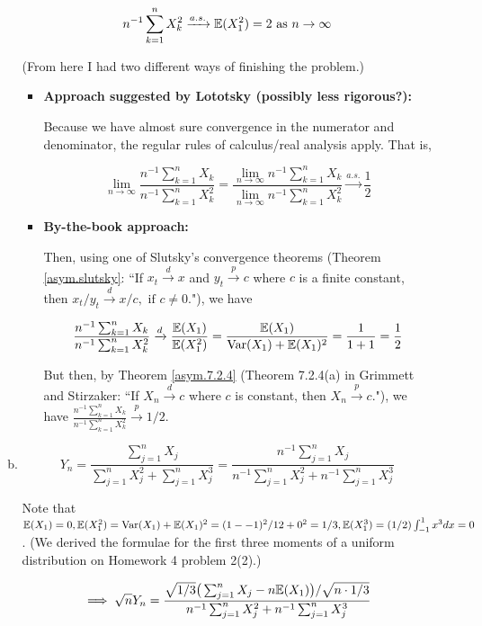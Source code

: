 \begin{enumerate}[(1)]
\begin{enumerate}[(a)]
\[
 n^{-1}\sum_{k=1}^n X_k^2 \xrightarrow{a.s.}\mathbb{E}(X_1^2) = 2 \text{ as } n \to \infty
 \]

(From here I had two different ways of finishing the problem.)

\begin{itemize}

\item \textbf{Approach suggested by Lototsky (possibly less rigorous?):}
 
 Because we have almost sure convergence in the numerator and denominator, the regular rules of calculus/real analysis apply. That is,
 
 \[
 \lim_{n \to \infty} \frac{n^{-1}\sum_{k=1}^n X_k}{n^{-1}\sum_{k=1}^n X_k^2} =  \frac{\lim_{n \to \infty} n^{-1}\sum_{k=1}^n X_k}{\lim_{n \to \infty} n^{-1}\sum_{k=1}^n X_k^2} \xrightarrow{a.s.} \boxed{\frac{1}{2}}
 \]

\item \textbf{By-the-book approach:}

Then, using one of  Slutsky's convergence theorems (Theorem \ref{asym.slutsky}: ``If \(x_t \xrightarrow{d} x\) and \(y_t \xrightarrow{p} c\) where \(c\) is a finite constant, then \(x_t/y_t \xrightarrow{d}  x/c, \text{ if } c \neq 0\)."), we have

\[
\frac{n^{-1}\sum_{k=1}^n X_k}{n^{-1}\sum_{k=1}^n X_k^2} \xrightarrow{d} \frac{\mathbb{E}(X_1)}{\mathbb{E}(X_1^2)} =  \frac{\mathbb{E}(X_1)}{\mathrm{Var}(X_1) + \mathbb{E}(X_1)^2}  =  \frac{1}{1+1} = \frac{1}{2}
\]

But then, by Theorem \ref{asym.7.2.4} (Theorem 7.2.4(a) in Grimmett and Stirzaker: ``If \(X_n \xrightarrow{d} c\) where \(c\) is constant, then \(X_n \xrightarrow{p} c\)."), we have \(\frac{n^{-1}\sum_{k=1}^n X_k}{n^{-1}\sum_{k=1}^n X_k^2} \xrightarrow{p} 1/2\). 

\end{itemize}

\item 

\[
Y_n = \frac{\sum_{j=1}^n X_j}{\sum_{j=1}^n X_j^2 + \sum_{j=1}^n X_j^3} =  \frac{n^{-1}\sum_{j=1}^n X_j}{n^{-1}\sum_{j=1}^n X_j^2 + n^{-1}\sum_{j=1}^n X_j^3} 
\]

Note that \(\mathbb{E}(X_1) = 0, \mathbb{E}(X_1^2) = \mathrm{Var}(X_1) + \mathbb{E}(X_1)^2 = (1 - -1)^2/12 + 0^2 = 1/3 , \mathbb{E}(X_1^3) = (1/2) \int_{-1}^1 x^3 dx = 0 \). (We derived the formulae for the first three moments of a uniform distribution on Homework 4 problem 2(2).) 

\[
\implies \sqrt{n} Y_n =  \frac{\sqrt{1/3} \big(\sum_{j=1}^n X_j - n\mathbb{E}(X_1) \big)/ \sqrt{n \cdot1/3} }{n^{-1}\sum_{j=1}^n X_j^2 + n^{-1}\sum_{j=1}^n X_j^3} 
\]
 

\end{enumerate}
\end{enumerate}
